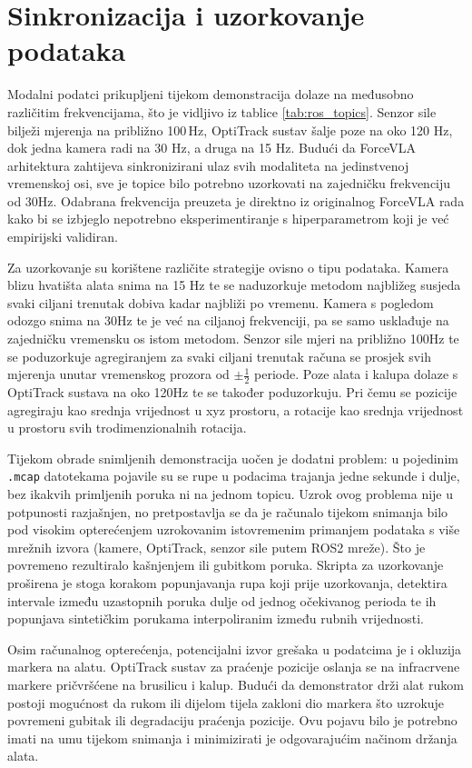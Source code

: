 \documentclass[times, utf8, diplomski]{fer}
\begin{document}
\section{Sinkronizacija i uzorkovanje podataka}

Modalni podatci prikupljeni tijekom demonstracija dolaze na međusobno različitim frekvencijama, što je vidljivo iz tablice \ref{tab:ros_topics}. Senzor sile bilježi mjerenja na približno 100\,Hz, OptiTrack sustav šalje poze na oko 120 Hz, dok jedna kamera radi na 30 Hz, a druga na 15 Hz. Budući da ForceVLA arhitektura zahtijeva sinkronizirani ulaz svih modaliteta na jedinstvenoj vremenskoj osi, sve je topice bilo potrebno uzorkovati na zajedničku frekvenciju od 30Hz. Odabrana frekvencija preuzeta je direktno iz originalnog ForceVLA rada kako bi se izbjeglo nepotrebno eksperimentiranje s hiperparametrom koji je već empirijski validiran.

Za uzorkovanje su korištene različite strategije ovisno o tipu podataka. Kamera blizu hvatišta alata snima na 15 Hz te se naduzorkuje metodom najbližeg susjeda svaki ciljani trenutak dobiva kadar najbliži po vremenu. Kamera s pogledom odozgo snima na 30Hz te je već na ciljanoj frekvenciji, pa se samo usklađuje na zajedničku vremensku os istom metodom. Senzor sile mjeri na približno 100Hz te se poduzorkuje agregiranjem za svaki ciljani trenutak računa se prosjek svih mjerenja unutar vremenskog prozora od $\pm\frac{1}{2}$ periode. Poze alata i kalupa dolaze s OptiTrack sustava na oko 120Hz te se također poduzorkuju. Pri čemu se pozicije agregiraju kao srednja vrijednost u xyz prostoru, a rotacije kao srednja vrijednost u prostoru svih trodimenzionalnih rotacija.

Tijekom obrade snimljenih demonstracija uočen je dodatni problem: u pojedinim \texttt{.mcap} datotekama pojavile su se rupe u podacima trajanja jedne sekunde i dulje, bez ikakvih primljenih poruka ni na jednom topicu. Uzrok ovog problema nije u potpunosti razjašnjen, no pretpostavlja se da je računalo tijekom snimanja bilo pod visokim opterećenjem uzrokovanim istovremenim primanjem podataka s više mrežnih izvora (kamere, OptiTrack, senzor sile putem ROS2 mreže). Što je povremeno rezultiralo kašnjenjem ili gubitkom poruka. Skripta za uzorkovanje proširena je stoga korakom popunjavanja rupa koji prije uzorkovanja, detektira intervale između uzastopnih poruka dulje od jednog očekivanog perioda te ih popunjava sintetičkim porukama interpoliranim između rubnih vrijednosti.

Osim računalnog opterećenja, potencijalni izvor grešaka u podatcima je i okluzija markera na alatu. OptiTrack sustav za praćenje pozicije oslanja se na infracrvene markere pričvršćene na brusilicu i kalup. Budući da demonstrator drži alat rukom postoji mogućnost da rukom ili dijelom tijela zakloni dio markera što uzrokuje povremeni gubitak ili degradaciju praćenja pozicije. Ovu pojavu bilo je potrebno imati na umu tijekom snimanja i minimizirati je odgovarajućim načinom držanja alata.
\end{document}
